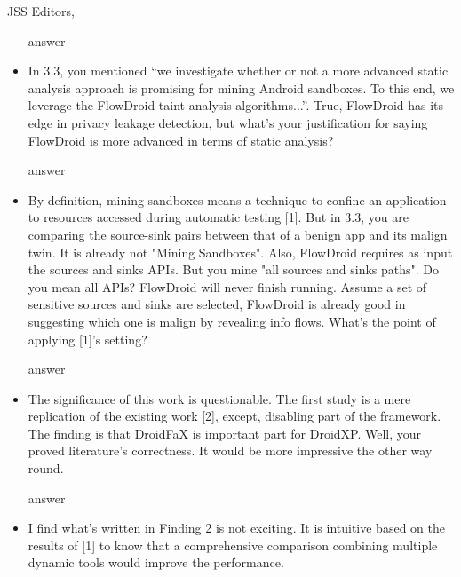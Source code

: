 \documentclass{letter}
\begin{document}
\begin{letter}{JSS Editors,}
\begin{itemize}
{\color{blue}{\bf Answer:} answer}

\vspace{0.2cm}

\item In 3.3, you mentioned ``we investigate whether or not a more advanced static analysis approach is promising for mining 
Android sandboxes. To this end, we leverage the FlowDroid taint analysis algorithms...''. True, FlowDroid has its edge 
in privacy leakage detection, but what's your justification for saying FlowDroid is more advanced in terms of static analysis?


\vspace{0.2cm}

{\color{blue}{\bf Answer:} answer}

\vspace{0.2cm}

\item By definition, mining sandboxes means a technique to confine an application to resources accessed during automatic 
testing [1]. But in 3.3, you are comparing the source-sink pairs between that of a benign app and its malign twin. It is already 
not "Mining Sandboxes". Also, FlowDroid requires as input the sources and sinks APIs. But you mine "all sources and sinks 
paths". Do you mean all APIs? FlowDroid will never finish running. Assume a set of sensitive sources and sinks are selected, 
FlowDroid is already good in suggesting which one is malign by revealing info flows. What's the point of applying [1]'s setting?


\vspace{0.2cm}

{\color{blue}{\bf Answer:} answer}

\vspace{0.2cm}

\item The significance of this work is questionable. The first study is a mere replication of the existing work [2], except, disabling 
part of the framework. The finding is that DroidFaX is important part for DroidXP. Well, your proved literature's correctness. 
It would be more impressive the other way round.


\vspace{0.2cm}

{\color{blue}{\bf Answer:} answer}

\vspace{0.2cm}

\item I find what's written in Finding 2 is not exciting. It is intuitive based on the results of [1] to know that a comprehensive 
comparison combining multiple dynamic tools would improve the performance.



\end{itemize}
\end{letter}
\end{document}
